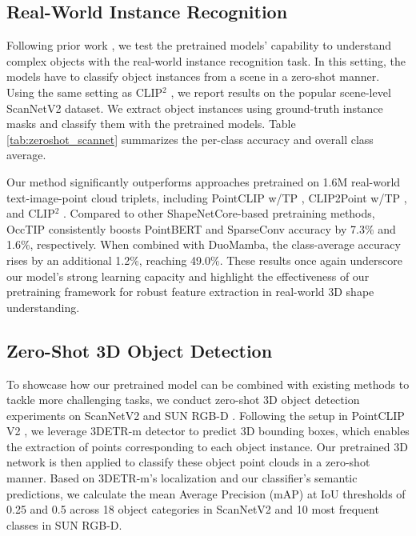 \subsection{Real-World Instance Recognition}
\label{subsec:ins_cls}
Following prior work \cite{clip2, tamm}, we test the pretrained models' capability to understand complex objects with the real-world instance recognition task. In this setting, the models have to classify object instances from a scene in a zero-shot manner. Using the same setting as CLIP$^2$ \cite{clip2}, we report results on the popular scene-level ScanNetV2 \cite{scannetv2} dataset. We extract object instances using ground-truth instance masks and classify them with the pretrained models. Table \ref{tab:zeroshot_scannet} summarizes the per-class accuracy and overall class average.

Our method significantly outperforms approaches pretrained on 1.6M real-world text-image-point cloud triplets, including PointCLIP w/TP \cite{pointclip}, CLIP2Point w/TP \cite{clip2point}, and CLIP$^2$ \cite{clip2}. Compared to other ShapeNetCore-based pretraining methods, OccTIP consistently boosts PointBERT \cite{pointbert} and SparseConv \cite{sparseconv} accuracy by 7.3\% and 1.6\%, respectively. When combined with DuoMamba, the class-average accuracy rises by an additional 1.2\%, reaching 49.0\%. These results once again underscore our model’s strong learning capacity and highlight the effectiveness of our pretraining framework for robust feature extraction in real-world 3D shape understanding.

\subsection{Zero-Shot 3D Object Detection}
\label{subsec:obj_det}

To showcase how our pretrained model can be combined with existing methods to tackle more challenging tasks, we conduct zero-shot 3D object detection experiments on ScanNetV2 \cite{scannetv2} and SUN RGB-D \cite{sunrgbd}. Following the setup in PointCLIP V2 \cite{pointclipv2}, we leverage 3DETR-m \cite{3detr} detector to predict 3D bounding boxes, which enables the extraction of points corresponding to each object instance. Our pretrained 3D network is then applied to classify these object point clouds in a zero-shot manner. Based on 3DETR-m’s localization and our classifier’s semantic predictions, we calculate the mean Average Precision (mAP) at IoU thresholds of 0.25 and 0.5 across 18 object categories in ScanNetV2 and 10 most frequent classes in SUN RGB-D.

